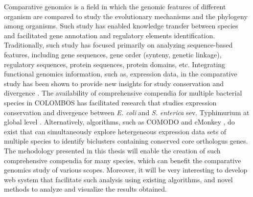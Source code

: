 Comparative genomics is a field in which the genomic features of different
organism are compared to study the evolutionary mechanisms and the phylogeny
among organisms.  Such study has enabled knowledge transfer between species and
facilitated gene annotation and regulatory elements identification.
%
Traditionally, such study has focused primarily on analyzing sequence-based
features, including gene sequences, gene order (synteny, genetic linkage),
regulatory sequences, protein sequences, protein domains, etc.
%
Integrating functional genomics information, such as, expression data, in the
comparative study has been shown to provide new insights for study
conservation and divergence \cite{Bergmann2004}.
%
The availability of comprehensive compendia for multiple bacterial species in
COLOMBOS has facilitated research that studies expression conservation and
divergence between \textit{E. coli} and \textit{S. enterica} sev. Typhimurium
at global level \cite{Meysman2013}.
%
Alternatively, algorithms, such as COMODO \cite{Zarrineh2011} and cMonkey
\cite{Waltman2010}, do exist that can simultaneously explore hetergeneous
expression data sets of multiple species to identify biclusters containing
conserved core orthologus genes.
%
The mehodology presented in this thesis will enable the creation of such
comprehensive compendia for many species, which can benefit the comparative
genomics study of various scopes.
%
Moreover, it will be very interesting to develop web system that
facilitate such analysis using existing algorithms, and novel methods
to analyze and visualize the results obtained.
%







